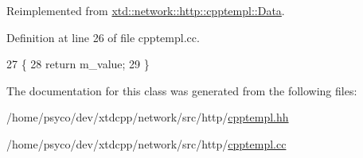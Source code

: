 Reimplemented from \hyperlink{classxtd_1_1network_1_1http_1_1cpptempl_1_1Data_a85999dd8f43177cabf072ddbc406e556}{xtd\+::network\+::http\+::cpptempl\+::\+Data}.



Definition at line 26 of file cpptempl.\+cc.


\begin{DoxyCode}
27 \{
28   \textcolor{keywordflow}{return} m\_value;
29 \}
\end{DoxyCode}


The documentation for this class was generated from the following files\+:\begin{DoxyCompactItemize}
\item 
/home/psyco/dev/xtdcpp/network/src/http/\hyperlink{cpptempl_8hh}{cpptempl.\+hh}\item 
/home/psyco/dev/xtdcpp/network/src/http/\hyperlink{cpptempl_8cc}{cpptempl.\+cc}\end{DoxyCompactItemize}
